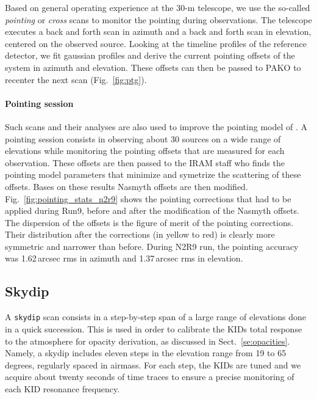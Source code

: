 Based on general operating experience at the 30-m telescope, we use the so-called
{\em pointing} or {\em cross} scans to monitor the pointing during observations. The
telescope executes a back and forth scan in azimuth and a back and forth scan in
elevation, centered on the observed source. Looking at the timeline profiles of
the reference detector, we fit gaussian profiles and derive the current pointing
offsets of the system in azimuth and elevation. These offsets can then be passed
to PAKO to recenter the next scan (Fig.~\ref{fig:ptg}).

\paragraph{Pointing session}
\label{se:pointing_session}

Such scans and their analyses are also used to improve the pointing model of
\nika. A pointing session consists in observing about 30 sources on a wide range
of elevations while monitoring the pointing offsets that are measured for each
observation. These offsets are then passed to the IRAM staff who finds the
pointing model parameters that minimize and symetrize the scattering of these
offsets. Bases on these results Nasmyth offsets are then
modified. Fig.~\ref{fig:pointing_stats_n2r9} shows the pointing corrections that
had to be applied during Run9, before and after the modification of the Nasmyth
offsets. The dispersion of the offsets is the figure of merit of the pointing
corrections. Their distribution after the corrections (in yellow to
red) is clearly more symmetric and narrower than before. During N2R9 run, the
pointing accuracy was 1.62\,arcsec rms in azimuth and 1.37\,arcsec rms in
elevation.

\subsection{Skydip}
\label{se:skydip}

A {\tt skydip} scan consists in a step-by-step span of a large range
of elevations done in a quick succession.  This is used in order to
calibrate the KIDs total response to the atmosphere for opacity
derivation, as discussed in Sect.~\ref{se:opacities}.  Namely, a
skydip includes eleven steps in the elevation range from 19 to 65
degrees, regularly spaced in airmass. For each step, the KIDs are
tuned and we acquire about twenty seconds of time traces to ensure a
precise monitoring of each KID resonance frequency.

